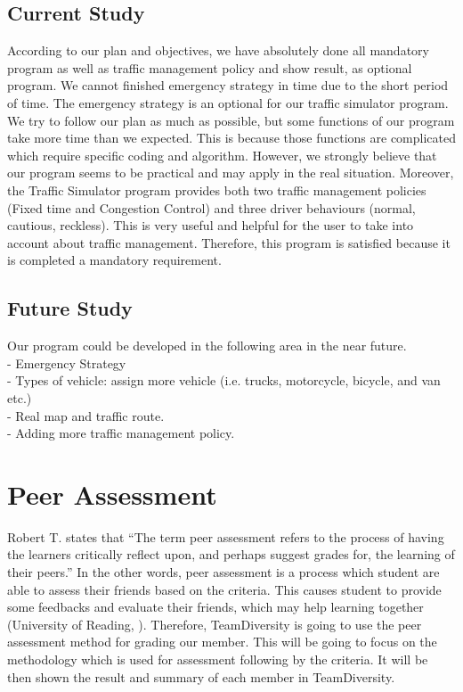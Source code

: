 \documentclass[11pt]{article}
\begin{document}
	\subsection{Current Study}
	\indent\indent According to our plan and objectives, we have absolutely done all mandatory program as well as traffic management policy and show result, as optional program. We cannot finished emergency strategy in time due to the short period of time. The emergency strategy is an optional for our traffic simulator program. We try to follow our plan as much as possible, but some functions of our program take more time than we expected. This is because those functions are complicated which require specific coding and algorithm. However, we strongly believe  that our program seems to be practical and may apply in the real situation. Moreover, the Traffic Simulator program provides both two traffic management policies (Fixed time and Congestion Control)  and three driver behaviours (normal, cautious, reckless). This is very useful and helpful for the user to take into account about traffic management. Therefore, this program is satisfied because it is completed a mandatory requirement.   
	\subsection{Future Study}
	\indent\indent Our program could be developed in the following area in the near future.\\ 
		\indent\indent - Emergency Strategy\\
		\indent\indent - Types of vehicle: assign more vehicle (i.e. trucks, motorcycle, bicycle, and van etc.)\\
		\indent\indent - Real map and traffic route.\\
		\indent\indent - Adding more traffic management policy. 
    

\newpage	
\section{Peer Assessment}

\indent\indent Robert T. \cite{roberts2006self} states that “The term peer assessment refers to the process of having the learners critically reflect upon, and perhaps suggest grades for, the learning of their peers.” In the other words, peer assessment is a process which student are able to assess their friends based on the criteria. This causes student to provide some feedbacks and evaluate their friends, which may help learning together (University of Reading, \cite{peerAssessment}). Therefore, TeamDiversity is going to use the peer assessment method for grading our member. This will be going to focus on the methodology which is used for assessment following by the criteria. It will be then shown the result and summary of each member in TeamDiversity. 
\end{document}
